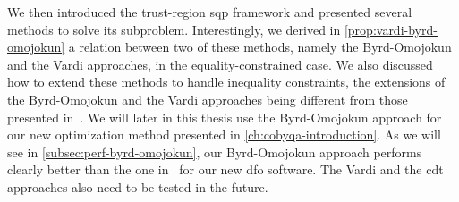 We then introduced the trust-region \gls{sqp} framework and presented several methods to solve its subproblem.
Interestingly, we derived in \cref{prop:vardi-byrd-omojokun} a relation between two of  these methods, namely the Byrd-Omojokun and the Vardi approaches, in the equality-constrained case.
We also discussed how to extend these methods to handle inequality constraints, the extensions of the Byrd-Omojokun and the Vardi approaches being different from those presented in~\cite[\S~15.4.4]{Conn_Gould_Toint_2000}.
We will later in this thesis use the Byrd-Omojokun approach for our new optimization method presented in \cref{ch:cobyqa-introduction}.
As we will see in \cref{subsec:perf-byrd-omojokun}, our Byrd-Omojokun approach performs clearly better than the one in~\cite[\S~15.4.4]{Conn_Gould_Toint_2000} for our new \gls{dfo} software.
The Vardi and the \gls{cdt} approaches also need to be tested in the future.
